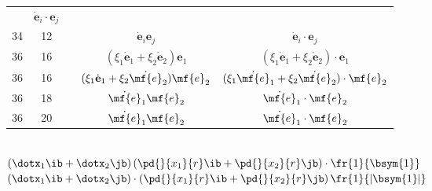 \documentclass[a4paper,11pt]{article}
\begin{document}
\begin{center}
\begin{tabular}{|c|c|c|c|c|}
           & $\dot{ \mathbf{ e } }_{ i } \cdot \mathbf{ e }_{ j }$ \\
    34  & 12 & & $\dot{ \mathbf{ e } }_{ i } \mathbf{ e }_{ j }$
           & $\dot{ \mathbf{ e } }_{ i } \cdot \mathbf{ e }_{ j }$ \\
    36  & 16 & & $( \xi_{ 1 } \dot{ \mathbf{ e } }_{ 1 } + \xi_{ 2 }
                \dot{ \mathbf{ e } }_{ 2 }  ) \mathbf{ e }_{ 1 }$
           & $( \xi_{ 1 } \dot{ \mathbf{ e } }_{ 1 } + \xi_{ 2 }
             \dot{ \mathbf{ e } }_{ 2 }  ) \cdot \mathbf{ e }_{ 1 }$ \\
    36  & 16 & & $( \xi_{ 1 } \dot{ \mathbf{ e } }_{ 1 } + \xi_{ 2 }
                \dot{ \mf{ e } }_{ 2 }  ) \mf{ e }_{ 2 }$
           & $( \xi_{ 1 } \dot{ \mf{ e } }_{ 1 } + \xi_{ 2 }
             \dot{ \mf{ e } }_{ 2 }  ) \cdot \mf{ e }_{ 2 }$ \\
    36  & 18 & & $\dot{ \mf{ e } }_{ 1 } \mf{ e }_{ 2 }$
           & $\dot{ \mf{ e } }_{ 1 } \cdot \mf{ e }_{ 2 }$ \\
    36  & 20 & & $\dot{ \mf{ e } }_{ 1 } \mf{ e }_{ 2 }$
           & $\dot{ \mf{ e } }_{ 1 } \cdot \mf{ e }_{ 2 }$ \\
    \hline
  \end{tabular}
\end{center}
\noi
{} \\
\Jest $( \dotx_{ 1 } \ib + \dotx_{ 2 } \jb )
\left( \pd{}{ x_{ 1 } }{ r } \ib + \pd{}{ x_{ 2 } }{ r } \jb \right)
\cdot \fr{ 1 }{ \bsym{ 1 } }$ \\
\Pow $( \dotx_{ 1 } \ib + \dotx_{ 2 } \jb )
\cdot \left( \pd{}{ x_{ 1 } }{ r } \ib + \pd{}{ x_{ 2 } }{ r } \jb \right)
\fr{ 1 }{ | \bsym{ 1 } | }$ \\





 {}



\end{document}
